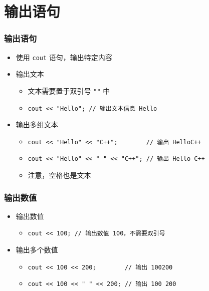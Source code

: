 \section{输出语句}

\begin{frame}[fragile]
    \frametitle{输出语句}

    \begin{itemize}
        \item<1-> 使用 \lstinline|cout| 语句，输出特定内容

        \item<2-> 输出文本

            \begin{itemize}
                \item 文本需要置于双引号 \lstinline|""| 中
                \item \lstinline|cout << "Hello"; // 输出文本信息 Hello| 
            \end{itemize}

        \item<3-> 输出多组文本

            \begin{itemize}
                \item \lstinline|cout << "Hello" << "C++";        // 输出 HelloC++| 
                \item \lstinline|cout << "Hello" << " " << "C++"; // 输出 Hello C++|
                \item 注意，空格也是文本
            \end{itemize}

    \end{itemize}
\end{frame}

\begin{frame}[fragile]
    \frametitle{输出数值}

    \begin{itemize}
        \item<1-> 输出数值

            \begin{itemize}
                \item \lstinline|cout << 100; // 输出数值 100，不需要双引号| 
            \end{itemize}

        \item<2-> 输出多个数值

            \begin{itemize}
                \item
                    \lstinline|cout << 100 << 200;        // 输出 100200| 
                \item
                    \lstinline|cout << 100 << " " << 200; // 输出 100 200| 
            \end{itemize}

    \end{itemize}
\end{frame}

